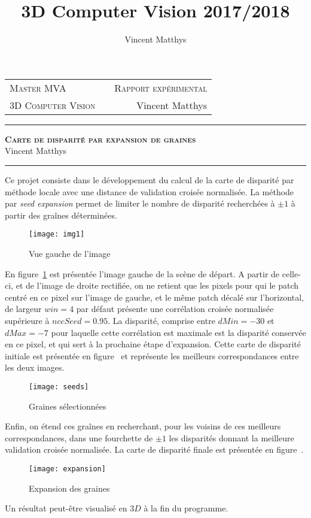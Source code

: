 \documentclass[12pt,a4paper,onecolumn]{article}
\title{3D Computer Vision 2017/2018}
\author{Vincent Matthys}
\begin{document}
\begin{tabularx}{0.8\textwidth}{@{} l X r @{} }
	{\textsc{Master MVA}}       &  & \textsc{Rapport expérimental} \\
	\textsc{3D Computer Vision} &  & {Vincent Matthys}             \\
\end{tabularx}
\vspace{1.5cm}
\begin{center}
	\rule[11pt]{5cm}{0.5pt}

	\textbf{\LARGE \textsc{Carte de disparité par expansion de graines}}
	\vspace{0.5cm}\\
	Vincent Matthys\\
	\rule{5cm}{0.5pt}
	\vspace{1.5cm}
\end{center}

Ce projet consiste dans le développement du calcul de la carte de disparité par méthode locale avec une distance de validation croisée normalisée. La méthode par \textit{seed expansion} permet de limiter le nombre de disparité recherchées à \(\pm 1\) à partir des graînes déterminées.

\begin{figure}[H]
	\centering
	\texttt{[image: img1]}
	\caption{Vue gauche de l'image}
	\label{fig_left_view}
\end{figure}

En figure~\ref{fig_left_view} est présentée l'image gauche de la scène de départ. A partir de celle-ci, et de l'image de droite rectifiée, on ne retient que les pixels pour qui le patch centré en ce pixel sur l'image de gauche, et le même patch décalé sur l'horizontal, de largeur \(win = 4\) par défaut présente une corrélation croisée normalisée supérieure à \(nccSeed = 0.95\). La disparité, comprise entre \(dMin = -30 \) et \(dMax = -7\) pour laquelle cette corrélation est maximale est la disparité conservée en ce pixel, et qui sert à la prochaine étape d'expansion. Cette carte de disparité initiale est présentée en figure~ et représente les meilleurs correspondances entre les deux images.

\begin{figure}[H]
	\centering
	\texttt{[image: seeds]}
	\caption{Graines sélectionnées}
	\label{fig_seeds}
\end{figure}

Enfin, on étend ces graînes en recherchant, pour les voisins de ces meilleurs correspondances, dans une fourchette de \(\pm1\) les disparités donnant la meilleure validation croisée normalisée. La carte de disparité finale est présentée en figure~.

\begin{figure}[H]
	\centering
	\texttt{[image: expansion]}
	\caption{Expansion des graines}
	\label{fig_expansion}
\end{figure}

Un résultat peut-être visualisé en \(3D\) à la fin du programme.
\end{document}
